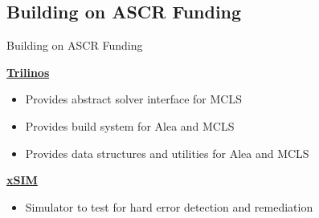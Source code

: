 \documentclass{beamer}
\begin{document}
\subsection{Building on ASCR Funding}

\begin{frame}{Building on ASCR Funding}

  \underline{\bf Trilinos}
  \begin{itemize}
  \item Provides abstract solver interface for MCLS
  \item Provides build system for Alea and MCLS
  \item Provides data structures and utilities for Alea and MCLS
  \end{itemize}

  \vfill

  \underline{\bf xSIM}
  \begin{itemize}
  \item Simulator to test for hard error detection and remediation
  \end{itemize}

\end{frame}

\end{document}
